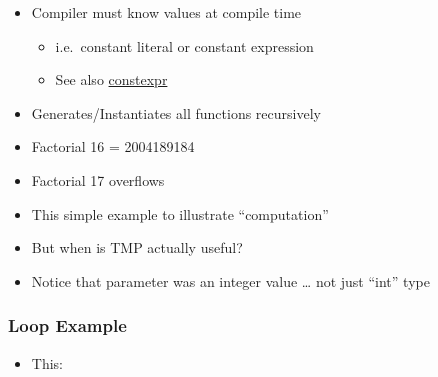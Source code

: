\begin{itemize}
\itemsep1pt\parskip0pt
\item
  Compiler must know values at compile time

  \begin{itemize}
  \itemsep1pt\parskip0pt
  \item
    i.e.~constant literal or constant expression
  \item
    See also
    \href{http://en.wikipedia.org/wiki/C\%2B\%2B11\#constexpr_.E2.80.93_Generalized_constant_expressions}{constexpr}
  \end{itemize}
\item
  Generates/Instantiates all functions recursively
\item
  Factorial 16 = 2004189184
\item
  Factorial 17 overflows
\item
  This simple example to illustrate ``computation''
\item
  But when is TMP actually useful?
\item
  Notice that parameter was an integer value \ldots{} not just ``int''
  type
\end{itemize}

\subsubsection{Loop Example}\label{loop-example}

\begin{itemize}
\itemsep1pt\parskip0pt
\item
  This:
\end{itemize}

